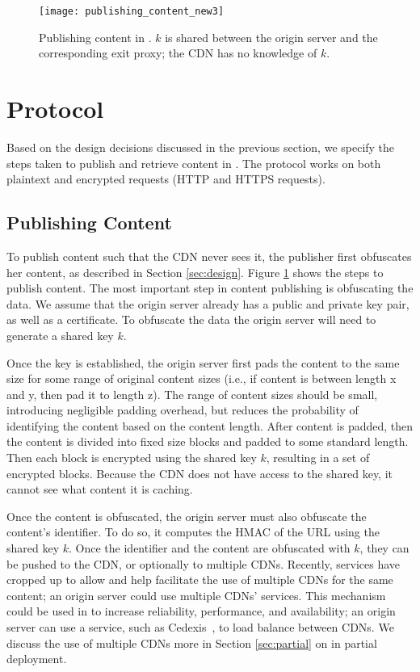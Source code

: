 \begin{figure}[t!]
\centering
\texttt{[image: publishing\_content\_new3]}
\caption{Publishing content in \system{}.  $k$ is shared between the 
origin server and the corresponding exit proxy; the CDN has no knowledge of $k$.}
\label{fig:publishing}
\end{figure}

\section{\system{} Protocol}
\label{sec:protocol}
Based on the design decisions discussed in the previous section, we specify the 
steps taken to publish and retrieve content in \system{}. The \system{} protocol works 
on both plaintext and encrypted requests (HTTP and HTTPS requests).

\subsection{Publishing Content}
\label{sec:publish_protocol}
To publish content such that the CDN never sees it, the publisher 
first obfuscates her content, as described in Section \ref{sec:design}. 
Figure \ref{fig:publishing} shows the steps to publish content. The most important step in content publishing is obfuscating the data.  We assume that the origin server already has a public and private key pair, as well as a certificate.  To obfuscate the data the origin server will need to generate a shared key $k$. 

Once the key is established, the origin server first pads the content to the same size for some 
range of original content sizes (i.e., if content is between length x and y, then pad it to length 
z).  The range of content sizes should be small, introducing negligible padding
overhead, but
reduces the probability of identifying the content based on the content length.  %
After 
content is padded, then the content is divided into fixed size blocks and padded to 
some standard length.  Then each block is encrypted using the shared key $k$, 
resulting in a set of encrypted blocks. Because the CDN does not have access to the shared key, 
it cannot see what content it is caching.  

Once the content is obfuscated, the origin server must also obfuscate the content's identifier.  To do so, 
it computes the HMAC of the URL using the shared key $k$.
Once the identifier and the content are obfuscated with $k$, they can be pushed to the CDN, or optionally to multiple 
CDNs.  Recently, services have cropped up to allow and help facilitate the use of multiple CDNs for the same content; an 
origin server could use multiple CDNs' services.  This mechanism could be used in \system{} to increase reliability, 
performance, and availability; an origin server can use a service, such as Cedexis~\cite{cedexis}, to load balance between 
CDNs.  We discuss the use of multiple CDNs more in Section \ref{sec:partial} on \system{} in 
partial deployment.

